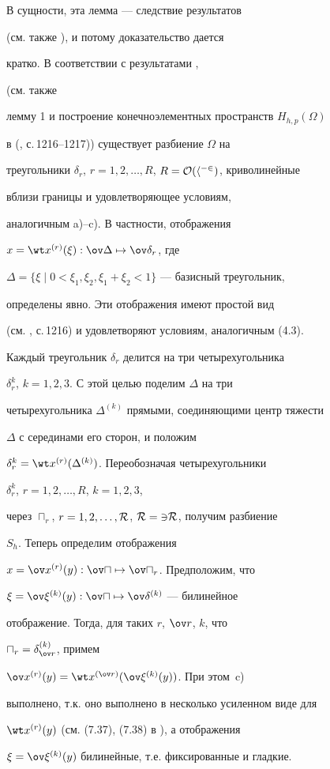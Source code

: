 




\begin{pf} В сущности, эта лемма --- следствие результатов


\cite{korneev2} (см. также \cite{korneev3}), и потому доказательство дается


кратко. В соответствии с результатами \cite{korneev2}, \cite{korneev3}


(см. также


лемму 1 и построение конечноэлементных пространств $H_{h,p}(\Omega)$


в (\cite{korneev4}, с.\,1216--1217)) существует разбиение $\Omega$ на


треугольники $\delta_r$, $r=1,2,\dotsc,R$, $R=\cal O(h^{-2})$, криволинейные


вблизи границы и удовлетворяющее условиям,


аналогичным a)--c). В частности, отображения


$x=\wt x^{(r)}(\xi):\ov\Delta\mapsto\ov\delta_r$, где


$\Delta=\{\xi\mid 0<\xi_1,\xi_2,\xi_1+\xi_2<1\}$ --- базисный треугольник,


определены явно. Эти отображения имеют простой вид


(см. \cite{korneev4}, с.\,1216) и удовлетворяют условиям, аналогичным (4.3).


Каждый треугольник $\delta_r$ делится на три четырехугольника


$\delta_r^{k}$, $k=1,2,3$. С этой целью поделим $\Delta$ на три


четырехугольника $\Delta^{(k)}$ прямыми, соединяющими центр тяжести


$\Delta$ с серединами его сторон, и положим


$\delta_r^{k}=\wt x^{(r)}(\Delta^{(k)})$. Переобозначая четырехугольники


$\delta_r^{k}$, $r=1,2,\dotsc,R$, $k=1,2,3$,


через $\sqcap_r$, $r=1,2,\dotsc,\cal R$, $\cal R=3R$, получим разбиение


$S_h$. Теперь определим отображения


$x=\ov x^{(r)}(y):\ov\sqcap\mapsto\ov\sqcap_r$. Предположим, что


$\xi=\ov\xi^{(k)}(y):\ov\sqcap\mapsto\ov\delta^{(k)}$ --- билинейное


отображение. Тогда, для таких $r$, $\ov r$, $k$, что


$\sqcap_r=\delta^{(k)}_{\ov r}$, примем


$\ov x^{(r)}(y)=\wt x^{(\ov r)}(\ov\xi^{(k)}(y))$. При этом~c)


выполнено, т.к. оно выполнено в несколько усиленном виде для


$\wt x^{(r)}(y)$ (см. (7.37), (7.38) в \cite{korneev3}), а отображения


$\xi=\ov\xi^{(k)}(y)$ билинейные, т.е. фиксированные и гладкие.


\end{pf}





